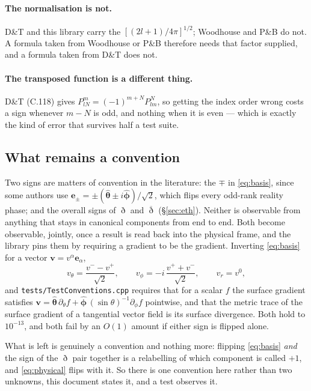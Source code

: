 \documentclass[11pt,a4paper]{article}
\newcommand{\ebasis}[1]{\mathbf{e}_{#1}}
\newcommand{\conj}[1]{\overline{#1}}
\newcommand{\code}[1]{\texttt{#1}}
\begin{document}
\paragraph{The normalisation is not.}  D\&T and this library carry the
$[(2l+1)/4\pi]^{1/2}$; Woodhouse and P\&B do not.  A formula taken from
Woodhouse or P\&B therefore needs that factor supplied, and a formula
taken from D\&T does not.

\paragraph{The transposed function is a different thing.}  D\&T (C.118)
gives $P^{m}_{lN} = (-1)^{m+N} P^{N}_{lm}$, so getting the index order
wrong costs a sign whenever $m-N$ is odd, and nothing when it is even ---
which is exactly the kind of error that survives half a test suite.

\subsection{What remains a convention}
\label{sec:remains}

Two signs are matters of convention in the literature: the $\mp$ in
\eqref{eq:basis}, since some authors use
$\ebasis{\pm}=\pm(\hat{\boldsymbol{\theta}}\pm
i\hat{\boldsymbol{\phi}})/\sqrt{2}$, which flips every odd-rank reality
phase; and the overall signs of $\eth$ and $\conj{\eth}$
(\S\ref{sec:eth}).  Neither is observable from anything that stays in
canonical components from end to end.  Both become observable, jointly,
once a result is read back into the physical frame, and the library pins
them by requiring a gradient to be the gradient.  Inverting
\eqref{eq:basis} for a vector $\mathbf{v}=v^{\alpha}\ebasis{\alpha}$,
\begin{equation}
  v_{\theta} = \frac{v^{-}-v^{+}}{\sqrt{2}},
  \qquad
  v_{\phi} = -i\,\frac{v^{+}+v^{-}}{\sqrt{2}},
  \qquad
  v_{r} = v^{0},
  \label{eq:physical}
\end{equation}
and \code{tests/TestConventions.cpp} requires that for a scalar $f$ the
surface gradient satisfies
$\mathbf{v}=\hat{\boldsymbol{\theta}}\,\partial_{\theta}f
+\hat{\boldsymbol{\phi}}\,(\sin\theta)^{-1}\partial_{\phi}f$ pointwise,
and that the metric trace of the surface gradient of a tangential vector
field is its surface divergence.  Both hold to $10^{-13}$, and both fail
by an $O(1)$ amount if either sign is flipped alone.

What is left is genuinely a convention and nothing more: flipping
\eqref{eq:basis} \emph{and} the sign of the $\eth$ pair together is a
relabelling of which component is called $+1$, and \eqref{eq:physical}
flips with it.  So there is one convention here rather than two unknowns,
this document states it, and a test observes it.
\end{document}
